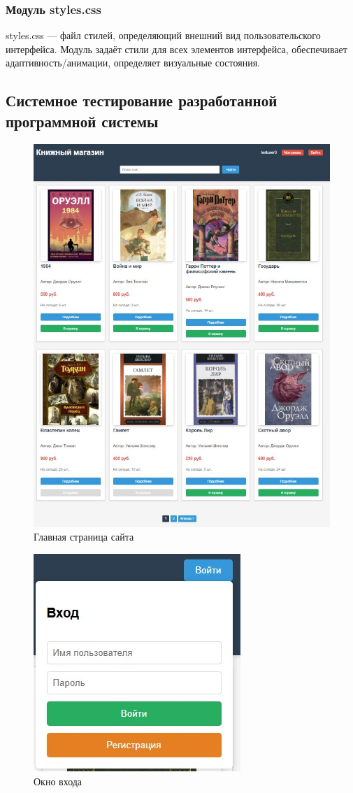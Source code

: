 \subsubsection{Модуль styles.css}
styles.css — файл стилей, определяющий внешний вид пользовательского интерфейса. Модуль задаёт стили для всех элементов интерфейса, обеспечивает адаптивность/анимации, определяет визуальные состояния.

\subsection{Системное тестирование разработанной программной системы}

\begin{figure}[H]
	\centering
	\includegraphics[width=0.7\linewidth]{images/Главная_страница_1}
	\caption{Главная страница сайта}
	\label{fig:1}
\end{figure}

\begin{figure}[H]
	\centering
	\includegraphics[width=0.5\linewidth]{images/Screenshot_3}
	\caption{Окно входа}
	\label{fig:screenshot3}
\end{figure}

